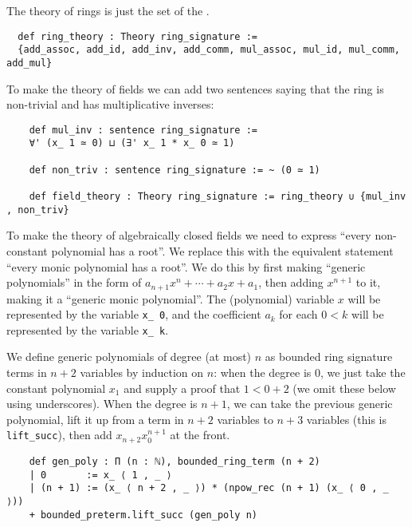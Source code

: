\begin{dfn}

  The theory of rings is just the set of the
  .

\begin{lstlisting}
  def ring_theory : Theory ring_signature :=
  {add_assoc, add_id, add_inv, add_comm, mul_assoc, mul_id, mul_comm, add_mul}\end{lstlisting}

  To make the theory of fields we can add two sentences saying that
  the ring is non-trivial and has multiplicative inverses:
  \begin{lstlisting}
    def mul_inv : sentence ring_signature :=
    ∀' (x_ 1 ≃ 0) ⊔ (∃' x_ 1 * x_ 0 ≃ 1)

    def non_triv : sentence ring_signature := ~ (0 ≃ 1)

    def field_theory : Theory ring_signature := ring_theory ∪ {mul_inv , non_triv} \end{lstlisting}

  To make the theory of algebraically closed fields we need to express
  ``every non-constant polynomial has a root''.
  We replace this with the equivalent statement ``every monic polynomial has a root''.
  We do this by first making ``generic polynomials''
  in the form of $a_{n+1}x^{n} + \cdots + a_{2}x + a_{1}$,
  then adding $x^{n+1}$ to it, making it a ``generic monic polynomial''.
  The (polynomial) variable $x$ will be represented by the variable \texttt{x\_ 0},
  and the coefficient $a_{k}$ for each $0 < k$ will be represented by the variable
  \texttt{x\_ k}.

  We define generic polynomials of degree (at most) $n$ as bounded ring signature terms
  in $n + 2$ variables by induction on $n$:
  when the degree is $0$, we just take the constant polynomial $x_{1}$
  and supply a proof that $1 < 0 + 2$ (we omit these below using underscores).
  When the degree is $n + 1$, we can take the previous generic polynomial,
  lift it up from a term in $n + 2$ variables to $n + 3$ variables
  (this is \texttt{lift\_succ}),
  then add $x_{n + 2} x_{0}^{n+1}$ at the front.

  \begin{lstlisting}
    def gen_poly : Π (n : ℕ), bounded_ring_term (n + 2)
    | 0       := x_ ⟨ 1 , _ ⟩
    | (n + 1) := (x_ ⟨ n + 2 , _ ⟩) * (npow_rec (n + 1) (x_ ⟨ 0 , _ ⟩))
    + bounded_preterm.lift_succ (gen_poly n)\end{lstlisting}


\end{dfn}
